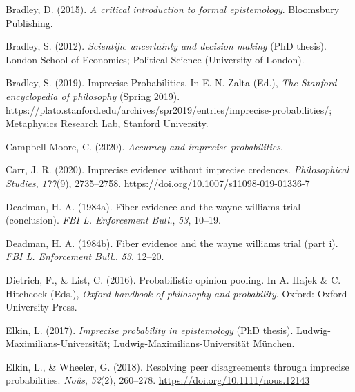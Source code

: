\documentclass[
  10pt,
  dvipsnames,enabledeprecatedfontcommands]{scrartcl}
\newlength{\cslhangindent}
\newlength{\cslentryspacingunit} %
\newenvironment{CSLReferences}[2] %
 {%
  \setlength{\parindent}{0pt}
  \ifodd #1
  \let\oldpar\par
  \def\par{\hangindent=\cslhangindent\oldpar}
  \fi
  \setlength{\parskip}{#2\cslentryspacingunit}
 }%
 {}
\begin{document}
\hypertarget{refs}{}
\begin{CSLReferences}{1}{0}
\leavevmode{}%
Bradley, D. (2015). \emph{A critical introduction to formal
epistemology}. Bloomsbury Publishing.

\leavevmode{}%
Bradley, S. (2012). \emph{Scientific uncertainty and decision making}
(PhD thesis). London School of Economics; Political Science (University
of London).

\leavevmode{}%
Bradley, S. (2019). {Imprecise Probabilities}. In E. N. Zalta (Ed.),
\emph{The {Stanford} encyclopedia of philosophy} ({S}pring 2019).
\url{https://plato.stanford.edu/archives/spr2019/entries/imprecise-probabilities/};
Metaphysics Research Lab, Stanford University.

\leavevmode{}%
Campbell-Moore, C. (2020). \emph{Accuracy and imprecise probabilities}.

\leavevmode{}%
Carr, J. R. (2020). Imprecise evidence without imprecise credences.
\emph{Philosophical Studies}, \emph{177}(9), 2735--2758.
\url{https://doi.org/10.1007/s11098-019-01336-7}

\leavevmode{}%
Deadman, H. A. (1984a). Fiber evidence and the wayne williams trial
(conclusion). \emph{FBI L. Enforcement Bull.}, \emph{53}, 10--19.

\leavevmode{}%
Deadman, H. A. (1984b). Fiber evidence and the wayne williams trial
(part i). \emph{FBI L. Enforcement Bull.}, \emph{53}, 12--20.

\leavevmode{}%
Dietrich, F., \& List, C. (2016). Probabilistic opinion pooling. In A.
Hajek \& C. Hitchcock (Eds.), \emph{Oxford handbook of philosophy and
probability}. Oxford: Oxford University Press.

\leavevmode{}%
Elkin, L. (2017). \emph{Imprecise probability in epistemology} (PhD
thesis). Ludwig-Maximilians-Universit{ä}t;
Ludwig-Maximilians-Universität München.

\leavevmode{}%
Elkin, L., \& Wheeler, G. (2018). Resolving peer disagreements through
imprecise probabilities. \emph{Noûs}, \emph{52}(2), 260--278.
\url{https://doi.org/10.1111/nous.12143}


\end{CSLReferences}
\end{document}
